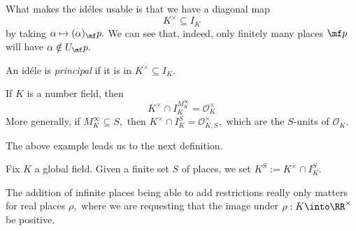 \documentclass[../notes.tex]{subfiles}
\begin{document}
What makes the id\'eles usable is that we have a diagonal map
\[K^\times\subseteq I_K\]
by taking $\alpha\mapsto(\alpha)_\mf p.$ We can see that, indeed, only finitely many places $\mf p$ will have $\alpha\notin U_\mf p.$
\begin{definition}
	An id\'ele is \textit{principal} if it is in $K^\times\subseteq I_K.$
\end{definition}
\begin{example}
	If $K$ is a number field, then
	\[K^\times\cap I_K^{M_K^\infty}=\mathcal O_K^\times\]
	More generally, if $M_K^\infty\subseteq S,$ then $K^\times\cap I_K^S=\mathcal O^\times_{K,S},$ which are the $S$-units of $\mathcal O_K.$
\end{example}
The above example leads us to the next definition.
\begin{definition}
	Fix $K$ a global field. Given a finite set $S$ of places, we set $K^S:=K^\times\cap I_K^S.$
\end{definition}
The addition of infinite places being able to add restrictions really only matters for real places $\rho,$ where we are requesting that the image under $\rho:K\into\RR^\times$ be positive.
\end{document}
